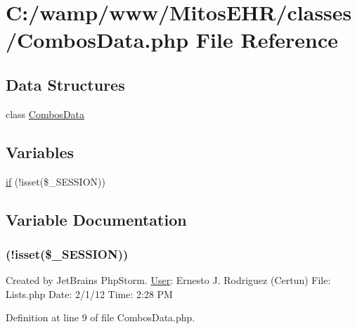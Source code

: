 \hypertarget{_combos_data_8php}{\section{\-C\-:/wamp/www/\-Mitos\-E\-H\-R/classes/\-Combos\-Data.php \-File \-Reference}
\label{_combos_data_8php}
}
\subsection*{\-Data \-Structures}
\begin{DoxyCompactItemize}
\item 
class \hyperlink{class_combos_data}{\-Combos\-Data}
\end{DoxyCompactItemize}
\subsection*{\-Variables}
\begin{DoxyCompactItemize}
\item 
\hyperlink{_combos_data_8php_a8ceca98aa29914fd2479a84a8d2242fb}{if} (!isset(\$\-\_\-\-S\-E\-S\-S\-I\-O\-N))
\end{DoxyCompactItemize}


\subsection{\-Variable \-Documentation}
\hypertarget{_combos_data_8php_a8ceca98aa29914fd2479a84a8d2242fb}{
\subsubsection[{if}]{(!isset(\$\-\_\-\-S\-E\-S\-S\-I\-O\-N))}}\label{_combos_data_8php_a8ceca98aa29914fd2479a84a8d2242fb}
\-Created by \-Jet\-Brains \-Php\-Storm. \hyperlink{class_user}{\-User}\-: \-Ernesto \-J. \-Rodriguez (\-Certun) \-File\-: \-Lists.\-php \-Date\-: 2/1/12 \-Time\-: 2\-:28 \-P\-M 

\-Definition at line 9 of file \-Combos\-Data.\-php.

